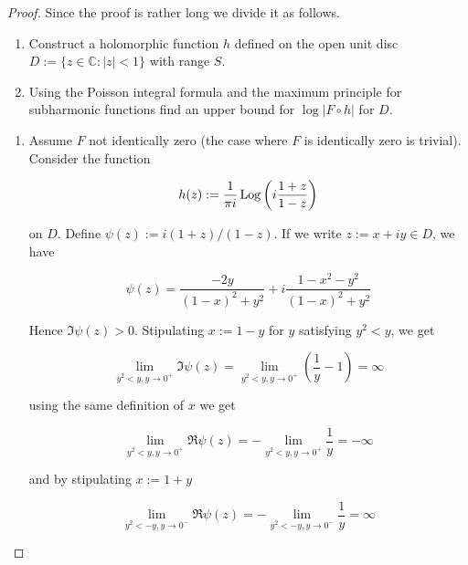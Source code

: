 \begin{proof}
	Since the proof is rather long we divide it as follows.

	\begin{enumerate}[label = \textbf{(\roman*.)}]
		\item Construct a holomorphic function $h$ defined on the open unit disc $D := \{z \in \mathbb{C} : \vert z \vert < 1\}$ with range $S$.
		\item Using the Poisson integral formula and the maximum principle for subharmonic functions find an upper bound for $\log\vert F \circ h\vert$ for $D$.
	\end{enumerate}

	\begin{enumerate}[label = \textbf{(\roman*.)}]
		\item Assume $F$ not identically zero (the case where $F$ is identically zero is trivial). Consider the function 

	\begin{equation}
		h(z) := \frac{1}{\pi i}\operatorname{Log}\left( i\frac{1 + z}{1 - z} \right)
	\end{equation}

	on $D$. Define $\psi(z) := i(1 + z)/(1 - z)$. If we write $z := x + iy \in D$, we have 

	\begin{equation}
		\psi(z) = \frac{-2y}{(1 - x)^2 + y^2} + i \frac{1 - x^2 - y^2}{(1 - x)^2 + y^2}
		\label{eq:rep_lft}
	\end{equation}

	Hence $\Im \psi(z) > 0$. Stipulating $x := 1 - y$ for $y$ satisfying $y^2 < y$, we get

	\begin{equation}
		\lim\limits_{y^2 < y, y \rightarrow 0^+} \Im \psi(z) = \lim\limits_{y^2 < y, y \rightarrow 0^+} \left( \frac{1}{y} - 1 \right) = \infty
	\end{equation}

	using the same definition of $x$ we get

	\begin{equation}
		\lim\limits_{y^2 < y, y \rightarrow 0^+} \Re \psi(z) = -\lim\limits_{y^2 < y, y \rightarrow 0^+} \frac{1}{y} = -\infty
	\end{equation}

	and by stipulating $x := 1 + y$

	\begin{equation}
		\lim\limits_{y^2 < -y, y \rightarrow 0^-} \Re \psi(z) = -\lim\limits_{y^2 < -y, y \rightarrow 0^-} \frac{1}{y} = \infty	
	\end{equation}



\end{enumerate}
\end{proof}
